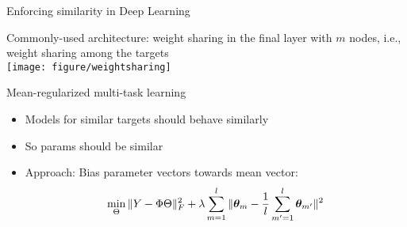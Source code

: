 \documentclass[11pt,compress,t,notes=noshow, xcolor=table]{beamer}
\begin{document}
\begin{frame}{Enforcing similarity in Deep Learning}
	\begin{center}
		Commonly-used architecture: weight sharing in the final layer with $m$ nodes, i.e., weight sharing among the targets \\
		\texttt{[image: figure/weightsharing]}
	\end{center}

    {\tiny \href{DOI:10.1016/b978-1-55860-307-3.50012-5}{}}

    
\end{frame}


\begin{frame}{Mean-regularized multi-task learning}
\begin{minipage}{0.5\textwidth}
    \begin{itemize} 				
        \item Models for similar targets should behave similarly
        
        \item So params should be similar
    \end{itemize}
    
\end{minipage}
\hfill
\begin{minipage}{0.45\textwidth}
    
\end{minipage}

\begin{itemize}
    \item Approach: Bias parameter vectors towards mean vector:
$$
            \min_\Theta \|Y - \Phi \Theta \|^2_F + \lambda \sum_{m=1}^l \|\bm{\theta}_m - \frac{1}{l} \sum_{m'=1}^l \bm{\theta}_{m'} \|^2 
$$    
\end{itemize}
    {\tiny \href{https://doi.org/10.1145/1014052.1014067}{}}
\end{frame}
\end{document}
